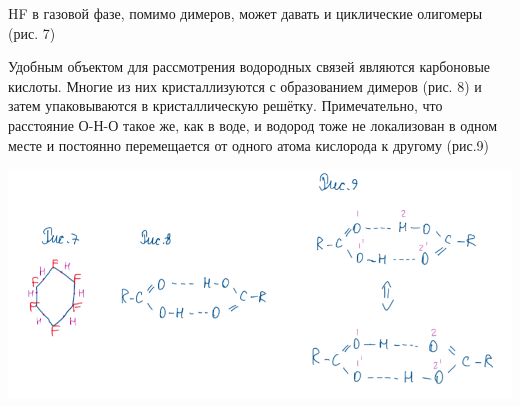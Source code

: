 HF в газовой фазе, помимо димеров, может давать и циклические олигомеры (рис. 7)

Удобным объектом для рассмотрения водородных связей являются карбоновые кислоты. Многие из них кристаллизуются с образованием димеров (рис. 8) и затем упаковываются в
кристаллическую решётку. Примечательно, что расстояние О-Н-О такое же, как в воде, и водород тоже не локализован в одном месте и постоянно перемещается от одного атома
кислорода к другому (рис.9)

\includegraphics{images/17v2.png}

